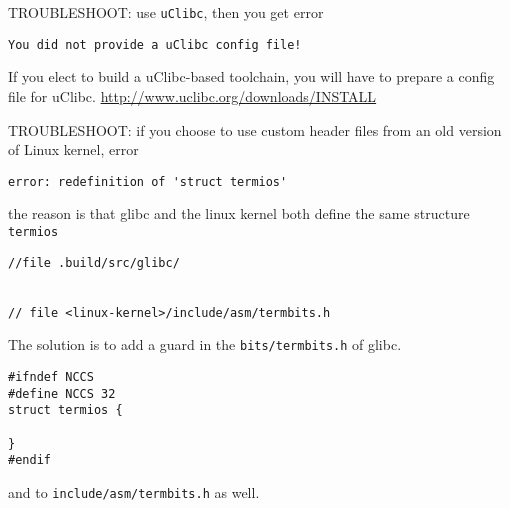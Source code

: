 TROUBLESHOOT: use \verb!uClibc!, then you get error
\begin{verbatim}
You did not provide a uClibc config file!
\end{verbatim}
If you elect to build a uClibc-based toolchain, you will have to prepare a config file for uClibc.
\url{http://www.uclibc.org/downloads/INSTALL}
 
TROUBLESHOOT: if you choose to use custom header files from an old version of Linux kernel, error
\begin{verbatim}
error: redefinition of 'struct termios'
\end{verbatim} 
the reason is that glibc and the linux kernel both define the same structure \verb!termios!
\begin{verbatim}
//file .build/src/glibc/


// file <linux-kernel>/include/asm/termbits.h

\end{verbatim}
The solution is to add a guard in the \verb!bits/termbits.h! of glibc.
\begin{verbatim}
#ifndef NCCS
#define NCCS 32
struct termios {

}
#endif
\end{verbatim}
and to \verb!include/asm/termbits.h! as well.

